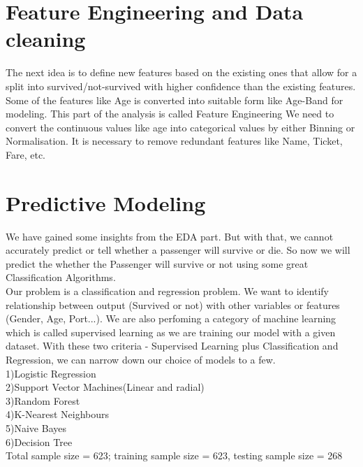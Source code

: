 \section{Feature Engineering and Data cleaning} \label{sec-datacleaning}
The next idea is to define new features based on the existing ones that allow for a split into survived/not-survived with higher confidence than the existing features.
Some of the features like Age is converted into suitable form like Age-Band for modeling. This part of the analysis is called Feature Engineering
We need to convert the continuous values like age into categorical values by either Binning or Normalisation. It is necessary to remove redundant features like Name, Ticket, Fare, etc.
\section{Predictive Modeling} \label{sec-modeling}
We have gained some insights from the EDA part. But with that, we cannot accurately predict or tell whether a passenger will survive or die. So now we will predict the whether the Passenger will survive or not using some great Classification Algorithms.\\
Our problem is a classification and regression problem. We want to identify relationship between output (Survived or not) with other variables or features (Gender, Age, Port...). We are also perfoming a category of machine learning which is called supervised learning as we are training our model with a given dataset. With these two criteria - Supervised Learning plus Classification and Regression, we can narrow down our choice of models to a few.\\
1)Logistic Regression\\
2)Support Vector Machines(Linear and radial)\\
3)Random Forest\\
4)K-Nearest Neighbours\\
5)Naive Bayes\\
6)Decision Tree\\
Total sample size = 623; training sample size = 623, testing sample size = 268\\
